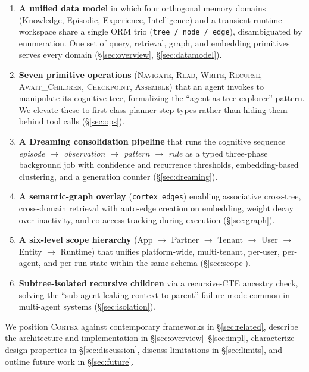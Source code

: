 \documentclass[11pt,a4paper]{article}
\theoremstyle{cortexprop}
\newcommand{\op}[1]{\textsc{#1}}
\newcommand{\code}[1]{\texttt{#1}}
\begin{document}
\begin{enumerate}
  \item \textbf{A unified data model} in which four orthogonal memory domains
  (Knowledge, Episodic, Experience, Intelligence) and a transient runtime
  workspace share a single ORM trio (\code{tree / node / edge}),
  disambiguated by enumeration. One set of query, retrieval, graph, and
  embedding primitives serves every domain (\S\ref{sec:overview},
  \S\ref{sec:datamodel}).

  \item \textbf{Seven primitive operations} (\op{Navigate}, \op{Read},
  \op{Write}, \op{Recurse}, \op{Await\_Children}, \op{Checkpoint},
  \op{Assemble}) that an agent invokes to manipulate its cognitive tree,
  formalizing the ``agent-as-tree-explorer'' pattern. We elevate these to
  first-class planner step types rather than hiding them behind tool calls
  (\S\ref{sec:ops}).

  \item \textbf{A Dreaming consolidation pipeline} that runs the cognitive
  sequence \textit{episode $\to$ observation $\to$ pattern $\to$ rule} as a
  typed three-phase background job with confidence and recurrence
  thresholds, embedding-based clustering, and a generation counter
  (\S\ref{sec:dreaming}).

  \item \textbf{A semantic-graph overlay} (\code{cortex\_edges}) enabling
  associative cross-tree, cross-domain retrieval with auto-edge creation on
  embedding, weight decay over inactivity, and co-access tracking during
  execution (\S\ref{sec:graph}).

  \item \textbf{A six-level scope hierarchy} (App $\to$ Partner $\to$ Tenant
  $\to$ User $\to$ Entity $\to$ Runtime) that unifies platform-wide,
  multi-tenant, per-user, per-agent, and per-run state within the same
  schema (\S\ref{sec:scope}).

  \item \textbf{Subtree-isolated recursive children} via a recursive-CTE
  ancestry check, solving the ``sub-agent leaking context to parent''
  failure mode common in multi-agent systems (\S\ref{sec:isolation}).
\end{enumerate}

We position \textsc{Cortex} against contemporary frameworks in
\S\ref{sec:related}, describe the architecture and implementation in
\S\ref{sec:overview}--\S\ref{sec:impl}, characterize design properties in
\S\ref{sec:discussion}, discuss limitations in \S\ref{sec:limits}, and
outline future work in \S\ref{sec:future}.
\end{document}
